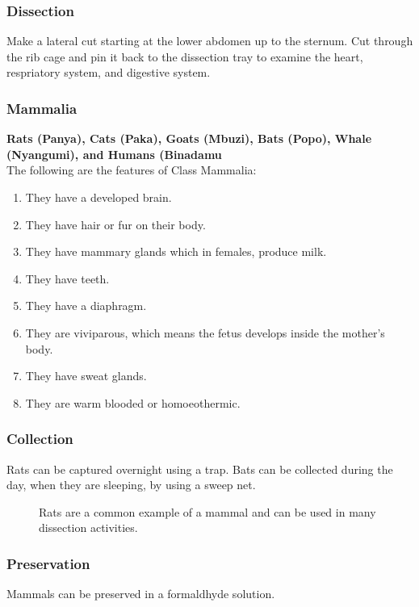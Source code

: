 \subsubsection{Dissection}
Make a lateral cut starting at the lower abdomen up to the sternum. Cut through the rib cage and pin it back to the dissection tray to examine the heart, respriatory system, and digestive system.

\subsubsection{Mammalia} 
\textbf{Rats (Panya), Cats (Paka), Goats (Mbuzi), Bats (Popo), Whale (Nyangumi), and Humans (Binadamu}\\
The following are the features of Class Mammalia:
\begin{enumerate}
\item{They have a developed brain.}
\item{They have hair or fur on their body.}
\item{They have mammary glands which in females, produce milk.}
\item{They have teeth.}
\item{They have a diaphragm.}
\item{They are viviparous, which means the fetus develops inside the mother’s body.}
\item{They have sweat glands.}
\item{They are warm blooded or homoeothermic.}
\end{enumerate}

\subsubsection{Collection}
Rats can be captured overnight using a trap. Bats can be collected during the day, when they are sleeping, by using a sweep net.

\begin{figure}[h]
\begin{center}
\def\svgwidth{6cm}

\caption{Rats are a common example of a mammal and can be used in many dissection activities.}
\label{fig:rat}
\end{center}
\end{figure}

\subsubsection{Preservation} 
Mammals can be preserved in a formaldhyde solution.

